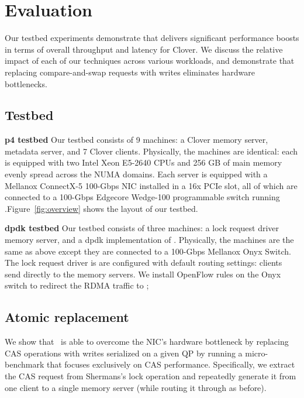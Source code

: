 \section{Evaluation}
\label{s:results}

Our testbed experiments demonstrate that {\sword} delivers significant
performance boosts in terms of overall throughput and latency for
Clover. We discuss the relative impact of each of our techniques across
various workloads, and demonstrate that replacing compare-and-swap
requests with writes eliminates hardware bottlenecks.

\subsection{Testbed} 

\textbf{p4 testbed} Our testbed consists of 9 machines: a Clover memory server,
metadata server, and 7 Clover clients. Physically, the machines are identical:
each is equipped with two Intel Xeon E5-2640 CPUs and 256 GB of main memory
evenly spread across the NUMA domains. Each server is equipped with a Mellanox
ConnectX-5 100-Gbps NIC installed in a 16x PCIe slot, all of which are connected
to a 100-Gbps Edgecore Wedge-100 programmable switch running
\sword.Figure~\ref{fig:overview} shows the layout of our testbed.


\textbf{dpdk testbed} Our testbed consists of three machines: a lock request
driver memory server, and a dpdk implementation of {\sword}.  Physically, the
machines are the same as above except they are connected to a 100-Gbps Mellanox
Onyx Switch. The lock request driver is are configured with default routing
settings: clients send directly to the memory servers. We install OpenFlow rules
on the Onyx switch to redirect the RDMA traffic to \sword; 

\subsection{Atomic replacement}

We show that \sword\ is able to overcome the NIC's hardware bottleneck
by replacing CAS operations with writes serialized on a given QP by
running a micro-benchmark that focuses exclusively on CAS
performance. Specifically, we extract the CAS request from
Shermans's lock operation and repeatedly generate it from one client
to a single memory server (while routing it through {\sword} as
before).


